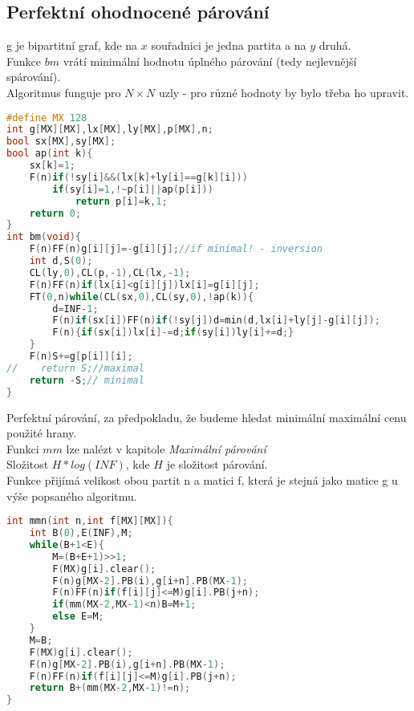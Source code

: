 \documentclass[11pt]{article}
\begin{document}
\subsection{Perfektní ohodnocené párování}
\textsf{g} je bipartitní graf, kde na $x$ souřadnici je jedna partita a na $y$ druhá.
\\Funkce $bm$ vrátí minimální hodnotu úplného párování (tedy nejlevnější spárování).
\\Algoritmus funguje pro $N\times N$ uzly - pro různé hodnoty by bylo třeba ho upravit.
\begin{lstlisting}[language=C++]
#define MX 128
int g[MX][MX],lx[MX],ly[MX],p[MX],n; 
bool sx[MX],sy[MX];
bool ap(int k){
    sx[k]=1; 
    F(n)if(!sy[i]&&(lx[k]+ly[i]==g[k][i]))
        if(sy[i]=1,!~p[i]||ap(p[i]))
            return p[i]=k,1;
    return 0; 
} 
int bm(void){ 
    F(n)FF(n)g[i][j]=-g[i][j];//if minimal! - inversion
    int d,S(0);
    CL(ly,0),CL(p,-1),CL(lx,-1);
    F(n)FF(n)if(lx[i]<g[i][j])lx[i]=g[i][j];
    FT(0,n)while(CL(sx,0),CL(sy,0),!ap(k)){
        d=INF-1;
        F(n)if(sx[i])FF(n)if(!sy[j])d=min(d,lx[i]+ly[j]-g[i][j]); 
        F(n){if(sx[i])lx[i]-=d;if(sy[i])ly[i]+=d;}
    }
    F(n)S+=g[p[i]][i]; 
//    return S;//maximal 
    return -S;// minimal
}
\end{lstlisting}
Perfektní párování, za předpokladu, že budeme hledat minimální maximální cenu použité hrany.
\\Funkci $mm$ lze nalézt v kapitole \textit{Maximální párování}
\\Složitost $H*log(INF)$, kde $H$ je složitost párování.
\\Funkce přijímá velikost obou partit \textsf{n} a matici \textsf{f}, která je stejná jako matice \textsf{g} u výše popsaného algoritmu.
\begin{lstlisting}[language=C++]
int mmn(int n,int f[MX][MX]){
    int B(0),E(INF),M;
    while(B+1<E){
        M=(B+E+1)>>1;
        F(MX)g[i].clear();
        F(n)g[MX-2].PB(i),g[i+n].PB(MX-1);
        F(n)FF(n)if(f[i][j]<=M)g[i].PB(j+n);
        if(mm(MX-2,MX-1)<n)B=M+1;
        else E=M;
    }
    M=B;
    F(MX)g[i].clear();
    F(n)g[MX-2].PB(i),g[i+n].PB(MX-1);
    F(n)FF(n)if(f[i][j]<=M)g[i].PB(j+n);
    return B+(mm(MX-2,MX-1)!=n);
}
\end{lstlisting}
\end{document}
